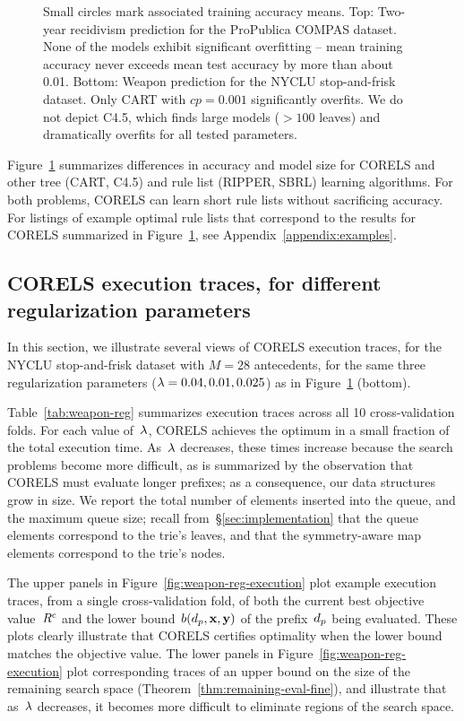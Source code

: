 \begin{figure}[t!]
{%
Small circles mark associated training accuracy means.
%
Top:  Two-year recidivism prediction for the ProPublica COMPAS dataset.
%
%
None of the models exhibit significant overfitting --
mean training accuracy never exceeds mean test accuracy
by more than about 0.01.
%
Bottom:  Weapon prediction for the NYCLU stop-and-frisk dataset.
%
%
Only CART with ${cp = 0.001}$ significantly overfits.
%
We do not depict C4.5, which finds large models (${>100}$ leaves)
and dramatically overfits for all tested parameters.
}
\label{fig:sparsity}
\end{figure}

Figure~\ref{fig:sparsity} summarizes differences in accuracy and model size
for CORELS and other tree (CART, C4.5) and rule list (RIPPER, SBRL) learning algorithms.
%
For both problems, CORELS can learn short rule lists without sacrificing accuracy.
%
For listings of example optimal rule lists that correspond to the results
for CORELS summarized in Figure~\ref{fig:sparsity}, see Appendix~\ref{appendix:examples}.

\subsection{CORELS execution traces, for different regularization parameters}
\label{sec:reg-param}

In this section, we illustrate several views of CORELS execution traces,
for the NYCLU stop-and-frisk dataset with ${M = 28}$ antecedents,
for the same three regularization parameters (${{\lambda} = 0.04, 0.01, 0.025}$)
as in Figure~\ref{fig:sparsity} (bottom).

Table~\ref{tab:weapon-reg} summarizes execution traces across all 10 cross-validation folds.
%
For each value of~${\lambda}$, CORELS achieves the optimum in a small fraction of the total execution time.
%
As~${\lambda}$ decreases, these times increase because the search problems become more difficult,
as is summarized by the observation that CORELS must evaluate longer prefixes;
as a consequence, our data structures grow in size.
%
We report the total number of elements inserted into the queue, and the maximum queue size;
recall from~\S\ref{sec:implementation} that the queue elements correspond to the trie's leaves,
and that the symmetry-aware map elements correspond to the trie's nodes.

The upper panels in Figure~\ref{fig:weapon-reg-execution} plot example execution traces,
from a single cross-validation fold, of both the current best objective value~${R^c}$
and the lower bound~$b(d_p, \mathbf{x}, \mathbf{y})$ of the prefix~$d_p$ being evaluated.
%
These plots clearly illustrate that CORELS certifies optimality
when the lower bound matches the objective value.
%
The lower panels in Figure~\ref{fig:weapon-reg-execution} plot corresponding traces of
an upper bound on the size of the remaining search space (Theorem~\ref{thm:remaining-eval-fine}),
and illustrate that as~${\lambda}$ decreases, it becomes more difficult to eliminate regions of the search space.

